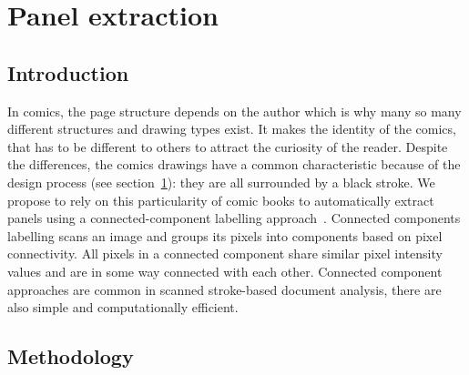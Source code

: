 \chapter{Panel extraction}
\label{chap:pe}
\graphicspath{{./chapters/4-pe/figs/}}


\section{Introduction}
\label{sec:pe:introduction}

In comics, the page structure depends on the author which is why many so many different structures and drawing types exist.
It makes the identity of the comics, that has to be different to others to attract the curiosity of the reader.
Despite the differences, the comics drawings have a common characteristic because of the design process (see section~\ref{}): they are all surrounded by a black stroke.
We propose to rely on this particularity of comic books to automatically extract panels  using a connected-component labelling approach~\cite{Szeliski2010Computer}.
Connected components labelling scans an image and groups its pixels into components based on pixel connectivity.
All pixels in a connected component share similar pixel intensity values and are in some way connected with each other.
Connected component approaches are common in scanned stroke-based document analysis, there are also simple and computationally efficient.






\section{Methodology}
\label{sec:pe:methodology}

